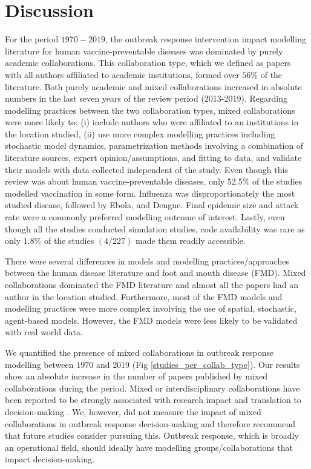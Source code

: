 \documentclass[10pt,letterpaper]{article}
\begin{document}
\section*{Discussion}
For the period $1970-2019$, the outbreak response intervention impact modelling literature for human vaccine-preventable diseases was dominated by purely academic collaborations. This collaboration type, which we defined as papers with all authors affiliated to academic institutions, formed over $56\%$ of the literature. Both purely academic and mixed collaborations increased in absolute numbers in the last seven years of the review period (2013-2019). Regarding modelling practices between the two collaboration types, mixed collaborations were more likely to: (i) include authors who were affiliated to an institutions in the location studied, (ii) use more complex modelling practices including stochastic model dynamics, parametrization methods involving a combination of literature sources, expert opinion/assumptions, and fitting to data, and validate their models with data collected independent of the study. Even though this review was about human vaccine-preventable diseases, only 52.5\% of the studies modelled vaccination in some form. Influenza was disproportionately the most studied disease, followed by Ebola, and Dengue. Final epidemic size and attack rate were a commonly preferred modelling outcome of interest. Lastly, even though all the studies conducted simulation studies, code availability was rare as only $1.8\%$ of the studies $(4/227)$ made them readily accessible.


There were several differences in models and modelling practices/approaches between the human disease literature and foot and mouth disease (FMD). Mixed collaborations dominated the FMD literature and almost all the papers had an author in the location studied. Furthermore, most of the FMD models and modelling practices were more complex involving the use of spatial, stochastic, agent-based models. However, the FMD models were less likely to be validated with real world data.

We quantified the presence of mixed collaborations in outbreak response modelling between $1970$ and $2019$ (Fig \ref{studies_per_collab_type}). Our results show an absolute increase in the number of papers published by mixed collaborations during the period. Mixed or interdisciplinary collaborations have been reported to be strongly associated with research impact and translation to decision-making \cite{Deelstra2003}. We, however, did not measure the impact of mixed collaborations in outbreak response decision-making and therefore recommend that future studies consider pursuing this. Outbreak response, which is broadly an operational field, should ideally have modelling groups/collaborations that impact decision-making. 
\end{document}
